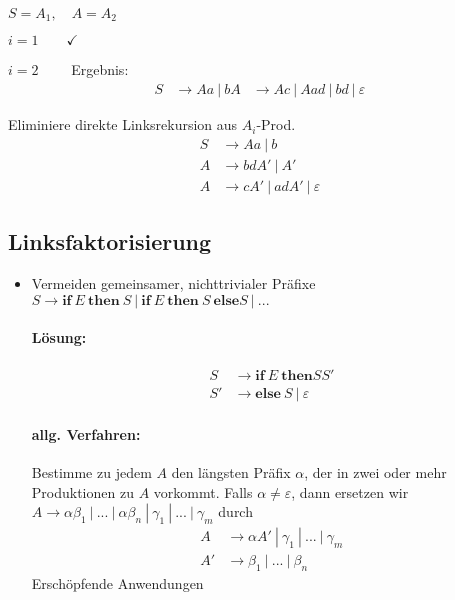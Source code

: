 \Bsp $S = A_1, \quad A = A_2$
\begin{description}
 \item $i = 1 \qquad \checkmark$
 \item $i = 2 \qquad$ Ergebnis:
     \begin{align*}
      S &\to Aa\ |\ b
      A &\to Ac\ |\ Aad\ |\ bd \ |\ \varepsilon
     \end{align*}
 \item Eliminiere direkte Linksrekursion aus $A_i$-Prod.
     \begin{align*}
      S &\to Aa\ |\ b \\
      A &\to bdA'\ |\ A' \\
      A &\to cA'\ |\ adA'\ |\ \varepsilon
     \end{align*}
\end{description}

\subsection{Linksfaktorisierung}
\begin{itemize}
 \item Vermeiden gemeinsamer, nichttrivialer Präfixe
 \Bsp $S \to \textbf{if}\ E\ \textbf{then}\ S\ |\ \textbf{if}\ E\ \textbf{then}\ S\ \textbf{else} S\ |\ ...$
 \paragraph*{Lösung:} 
     \begin{align*}
          S &\to \textbf{if}\ E\ \textbf{then} SS' \\
         S' &\to \textbf{else}\ S\ |\ \varepsilon
     \end{align*}
 \paragraph*{allg. Verfahren:} Bestimme zu jedem $A$ den längsten Präfix $\alpha$, der in zwei oder mehr Produktionen zu $A$ vorkommt.
    Falls $\alpha \neq \varepsilon$, dann ersetzen wir $A \to \alpha\beta_1\ |\ ...\ |\ \alpha\beta_n\ |\ \gamma_1\ |\ ...\ |\ \gamma_m$ durch
    \begin{align*}
     A &\to \alpha A'\ |\ \gamma_1\ |\ ...\ |\ \gamma_m \\
     A' &\to \beta_1\ |\ ...\ |\ \beta_n
    \end{align*}
    Erschöpfende Anwendungen
\end{itemize}

